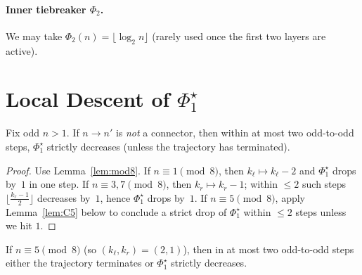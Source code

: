 \documentclass[11pt]{article}
\begin{document}
\paragraph{Inner tiebreaker $\Phi_2$.}
We may take $\Phi_2(n)=\lfloor\log_2 n\rfloor$ (rarely used once the first two layers are active).

\section{Local Descent of $\Phi_1^\star$}

\begin{prop}\label{prop:local-descent}
Fix odd $n>1$. If $n\to n'$ is \emph{not} a connector, then within at most two odd-to-odd steps, $\Phi_1^\star$ strictly decreases (unless the trajectory has terminated).
\end{prop}

\begin{proof}
Use Lemma~\ref{lem:mod8}.
If $n\equiv 1\pmod 8$, then $k_\ell\mapsto k_\ell-2$ and $\Phi_1^\star$ drops by~$1$ in one step.
If $n\equiv 3,7\pmod 8$, then $k_r\mapsto k_r-1$; within $\le 2$ such steps $\lfloor\frac{k_r-1}{2}\rfloor$ decreases by~$1$, hence $\Phi_1^\star$ drops by~$1$.
If $n\equiv 5\pmod 8$, apply Lemma~\ref{lem:C5} below to conclude a strict drop of $\Phi_1^\star$ within $\le 2$ steps unless we hit $1$.
\end{proof}

\begin{lemma}\label{lem:C5}
If $n\equiv 5\pmod 8$ (so $(k_\ell,k_r)=(2,1)$), then in at most two odd-to-odd steps either the trajectory terminates or $\Phi_1^\star$ strictly decreases.
\end{lemma}
\end{document}
